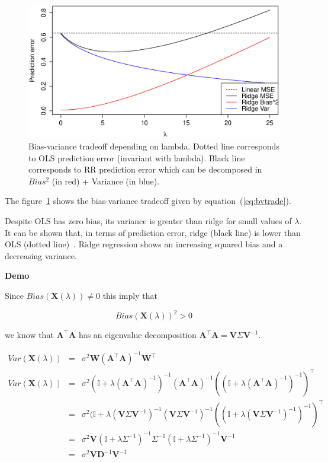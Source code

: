 \begin{figure}[h!]
\includegraphics[width=\linewidth]{img/biasvariance}
\caption{Bias-variance tradeoff depending on lambda. Dotted line corresponds to OLS prediction error (invariant with lambda). Black line corresponds to RR prediction error which can be decomposed in $Bias^2$ (in red) + Variance (in blue).}
\label{fig:biasvariance}
\end{figure}	


The figure~\ref{fig:biasvariance} shows the bias-variance tradeoff
given by equation~(\ref{eq:bvtrade}). 

Despite OLS has zero bias,
its variance is greater than ridge for small values of $\lambda$.
It can be shown that, in terms of prediction error, ridge (black line)
is lower than OLS (dotted line)~\cite{hoerl1970}. Ridge regression shows an
increasing squared bias and a decreasing variance.

\textbf{Demo}\quad

Since $Bias(\mathbf{X}(\lambda)) \neq 0$ this imply that

\begin{equation*}
Bias(\mathbf{X}(\lambda)) ^2 > 0 
\end{equation*}

\noindent we know that $\mathbf{A}^\top
\mathbf{A}$ has an eigenvalue decomposition $\mathbf{A}^\top
\mathbf{A} = \mathbf{V} \Sigma \mathbf{V}^{-1}$.


\begin{eqnarray*}
Var(\mathbf{X}(\lambda)) &=& \sigma^2 \mathbf{W}(\mathbf{A}^\top \mathbf{A} )^{-1}\mathbf{W}^\top\\
Var(\mathbf{X}(\lambda)) &=& \sigma^2 (\mathbb{I} + \lambda (\mathbf{A}^\top
\mathbf{A})^{-1})^{-1} (\mathbf{A}^\top \mathbf{A} )^{-1}((\mathbb{I} + \lambda (\mathbf{A}^\top
\mathbf{A})^{-1})^{-1} )^\top \\
&=& \sigma^2 (\mathbb{I} + \lambda (\mathbf{V} \Sigma \mathbf{V}^{-1})^{-1} (\mathbf{V} \Sigma \mathbf{V}^{-1})^{-1}((\mathbb{I} + \lambda (\mathbf{V} \Sigma \mathbf{V}^{-1})^{-1})^{-1} )^\top \\
&=& \sigma^2 \mathbf{V} (\mathbb{I} + \lambda \Sigma^{-1})^{-1} \Sigma^{-1} (\mathbb{I} + \lambda \Sigma^{-1})^{-1}  \mathbf{V}^{-1}\\
&=& \sigma^2 \mathbf{V} \mathbf{D}^{-1} \mathbf{V}^{-1}
\end{eqnarray*}

